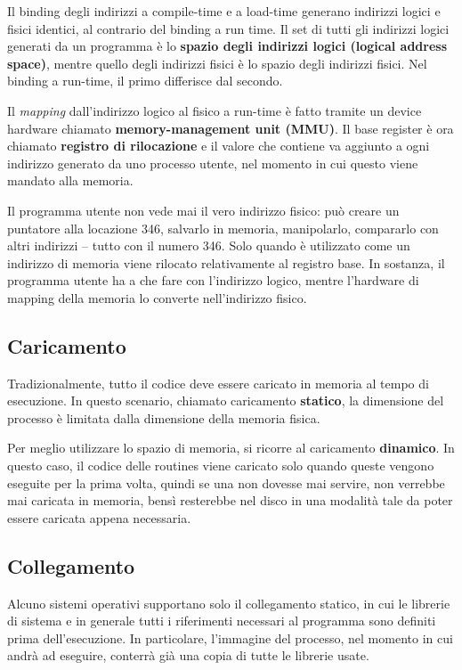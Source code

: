\documentclass[a4paper]{article}
\begin{document}
Il binding degli indirizzi a compile-time e a load-time generano indirizzi logici e fisici identici, al contrario del binding a run time. Il set di tutti gli indirizzi logici generati da un programma è lo \textbf{spazio degli indirizzi logici (logical address space)}, mentre quello degli indirizzi fisici è lo spazio degli indirizzi fisici. Nel binding a run-time, il primo differisce dal secondo.

Il \textit{mapping} dall'indirizzo logico al fisico a run-time è fatto tramite un device hardware chiamato \textbf{memory-management unit (MMU)}. Il base register è ora chiamato \textbf{registro di rilocazione} e il valore che contiene va aggiunto a ogni indirizzo generato da uno processo utente, nel momento in cui questo viene mandato alla memoria.

Il programma utente non vede mai il vero indirizzo fisico: può creare un puntatore alla locazione 346, salvarlo in memoria, manipolarlo, compararlo con altri indirizzi -- tutto con il numero 346. Solo quando è utilizzato come un indirizzo di memoria viene rilocato relativamente al registro base. In sostanza, il programma utente ha a che fare con l'indirizzo logico, mentre l'hardware di mapping della memoria lo converte nell'indirizzo fisico.

\subsection{Caricamento}
Tradizionalmente, tutto il codice deve essere caricato in memoria al tempo di esecuzione. In questo scenario, chiamato caricamento \textbf{statico}, la dimensione del processo è limitata dalla dimensione della memoria fisica.

Per meglio utilizzare lo spazio di memoria, si ricorre al caricamento \textbf{dinamico}. In questo caso, il codice delle routines viene caricato solo quando queste vengono eseguite per la prima volta, quindi se una non dovesse mai servire, non verrebbe mai caricata in memoria, bensì resterebbe nel disco in una modalità tale da poter essere caricata appena necessaria.

\subsection{Collegamento}
Alcuno sistemi operativi supportano solo il collegamento statico, in cui le librerie di sistema e in generale tutti i riferimenti necessari al programma sono definiti prima dell'esecuzione. In particolare, l'immagine del processo, nel momento in cui andrà ad eseguire, conterrà già una copia di tutte le librerie usate.
\end{document}
